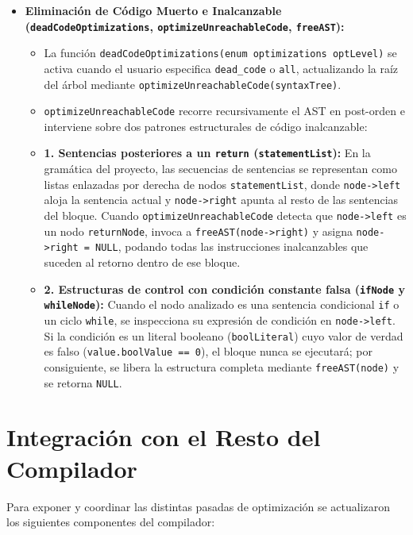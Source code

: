 \documentclass[12pt, a4paper]{article}
\begin{document}
\begin{itemize}
    \item \textbf{Eliminación de Código Muerto e Inalcanzable (\texttt{deadCode\allowbreak Optimizations}, \texttt{optimize\allowbreak Unreachable\allowbreak Code}, \texttt{freeAST}):}
    \begin{itemize}
        \item La función \texttt{deadCodeOptimizations(enum optimizations optLevel)} se activa cuando el usuario especifica \texttt{dead\_code} o \texttt{all}, actualizando la raíz del árbol mediante \texttt{optimizeUnreachableCode(\allowbreak syntaxTree)}.
        \item \texttt{optimizeUnreachableCode} recorre recursivamente el AST en post-orden e interviene sobre dos patrones estructurales de código inalcanzable:
        \item \textbf{1. Sentencias posteriores a un \texttt{return} (\texttt{statementList}):} En la gramática del proyecto, las secuencias de sentencias se representan como listas enlazadas por derecha de nodos \texttt{statementList}, donde \texttt{node->left} aloja la sentencia actual y \texttt{node->right} apunta al resto de las sentencias del bloque. Cuando \texttt{optimizeUnreachableCode} detecta que \texttt{node->left} es un nodo \texttt{returnNode}, invoca a \texttt{freeAST(node->right)} y asigna \texttt{node->right = NULL}, podando todas las instrucciones inalcanzables que suceden al retorno dentro de ese bloque.
        \item \textbf{2. Estructuras de control con condición constante falsa (\texttt{ifNode} y \texttt{whileNode}):} Cuando el nodo analizado es una sentencia condicional \texttt{if} o un ciclo \texttt{while}, se inspecciona su expresión de condición en \texttt{node->left}. Si la condición es un literal booleano (\texttt{boolLiteral}) cuyo valor de verdad es falso (\texttt{value.boolValue == 0}), el bloque nunca se ejecutará; por consiguiente, se libera la estructura completa mediante \texttt{freeAST(node)} y se retorna \texttt{NULL}.
    \end{itemize}
\end{itemize}

\section{Integración con el Resto del Compilador}
Para exponer y coordinar las distintas pasadas de optimización se actualizaron los siguientes componentes del compilador:
\end{document}
